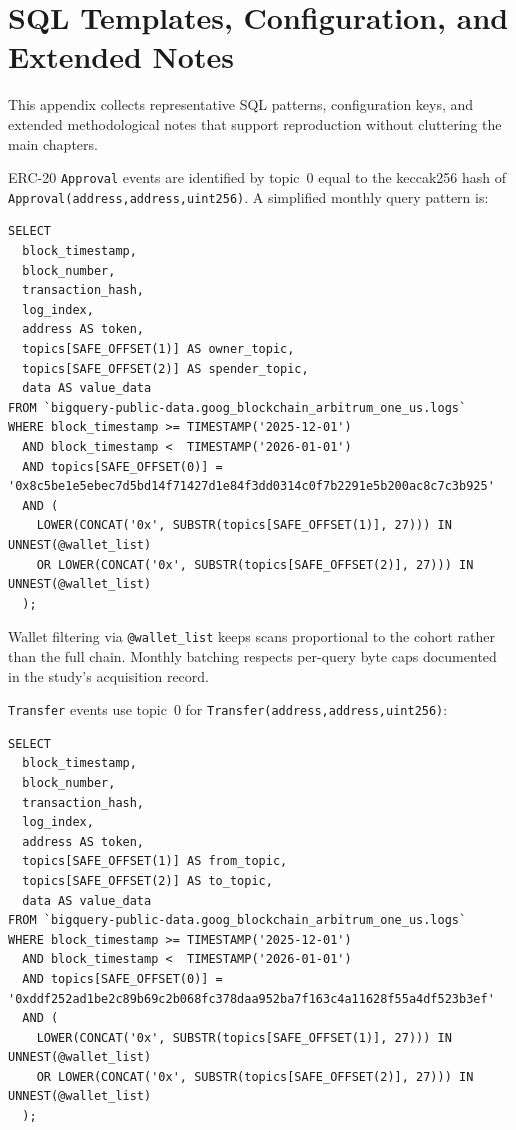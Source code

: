 \section{SQL Templates, Configuration, and Extended Notes}
\label{ch:appendix-sql}

This appendix collects representative SQL patterns, configuration keys, and extended methodological notes that support reproduction without cluttering the main chapters.


ERC-20 \texttt{Approval} events are identified by topic~$0$ equal to the keccak256 hash of \texttt{Approval(address,address,uint256)}. A simplified monthly query pattern is:

\begin{verbatim}
SELECT
  block_timestamp,
  block_number,
  transaction_hash,
  log_index,
  address AS token,
  topics[SAFE_OFFSET(1)] AS owner_topic,
  topics[SAFE_OFFSET(2)] AS spender_topic,
  data AS value_data
FROM `bigquery-public-data.goog_blockchain_arbitrum_one_us.logs`
WHERE block_timestamp >= TIMESTAMP('2025-12-01')
  AND block_timestamp <  TIMESTAMP('2026-01-01')
  AND topics[SAFE_OFFSET(0)] = '0x8c5be1e5ebec7d5bd14f71427d1e84f3dd0314c0f7b2291e5b200ac8c7c3b925'
  AND (
    LOWER(CONCAT('0x', SUBSTR(topics[SAFE_OFFSET(1)], 27))) IN UNNEST(@wallet_list)
    OR LOWER(CONCAT('0x', SUBSTR(topics[SAFE_OFFSET(2)], 27))) IN UNNEST(@wallet_list)
  );
\end{verbatim}

Wallet filtering via \texttt{@wallet\_list} keeps scans proportional to the cohort rather than the full chain. Monthly batching respects per-query byte caps documented in the study's acquisition record.


\texttt{Transfer} events use topic~$0$ for \texttt{Transfer(address,address,uint256)}:

\begin{verbatim}
SELECT
  block_timestamp,
  block_number,
  transaction_hash,
  log_index,
  address AS token,
  topics[SAFE_OFFSET(1)] AS from_topic,
  topics[SAFE_OFFSET(2)] AS to_topic,
  data AS value_data
FROM `bigquery-public-data.goog_blockchain_arbitrum_one_us.logs`
WHERE block_timestamp >= TIMESTAMP('2025-12-01')
  AND block_timestamp <  TIMESTAMP('2026-01-01')
  AND topics[SAFE_OFFSET(0)] = '0xddf252ad1be2c89b69c2b068fc378daa952ba7f163c4a11628f55a4df523b3ef'
  AND (
    LOWER(CONCAT('0x', SUBSTR(topics[SAFE_OFFSET(1)], 27))) IN UNNEST(@wallet_list)
    OR LOWER(CONCAT('0x', SUBSTR(topics[SAFE_OFFSET(2)], 27))) IN UNNEST(@wallet_list)
  );
\end{verbatim}

